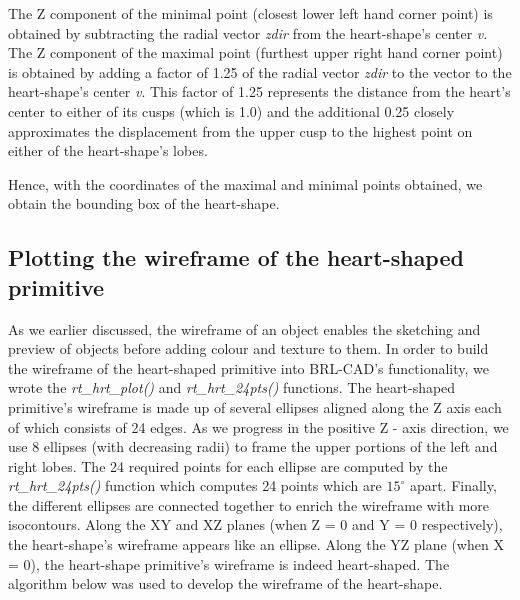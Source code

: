 \hspace{30} The   Z component   of   the   minimal   point   (closest   lower   left   hand   corner   point)   is  
obtained   by   subtracting   the   radial   vector \textit{zdir}  from   the   heart-­shape's   center \textit{v}. The   Z  
component   of   the   maximal   point   (furthest   upper   right   hand   corner   point)   is  
obtained   by   adding a factor   of   1.25 of the radial vector \textit{zdir}  to   the   vector   to   the   heart­-shape's  
center \textit{v}. This   factor   of   1.25 represents   the   distance   from   the   heart's  
center   to   either   of   its   cusps   (which   is   1.0)   and   the   additional   0.25   closely  
approximates   the   displacement   from   the   upper   cusp   to   the   highest   point   on  
either   of   the heart-shape's   lobes.

Hence, with   the   coordinates   of   the   maximal   and   minimal   points obtained, we obtain the bounding box of the heart-­shape.  

\subsection{Plotting the wireframe of the heart-­shaped primitive}

\hspace{30} As   we   earlier   discussed,   the   wireframe   of   an   object   enables   the  
sketching   and   preview   of   objects   before   adding   colour   and   texture   to   them.   In  
order   to   build   the   wireframe   of   the   heart-­shaped   primitive   into   BRL-­CAD's  
functionality,   we   wrote   the   \textit{rt\_hrt\_plot()}   and   \textit{rt\_hrt\_24pts()}   functions.   The  
heart-­shaped   primitive's   wireframe   is   made   up   of   several   ellipses   aligned   along  
the   Z   axis   each   of   which   consists   of   24   edges.   As   we   progress   in   the   positive  
 Z - ­axis   direction,   we   use   8   ellipses   (with   decreasing   radii)   to   frame   the   upper  
portions   of   the   left   and   right   lobes.   The   24   required   points   for   each   ellipse   are  
computed   by   the   \textit{rt\_hrt\_24pts()} function which computes 24 points which are $15^{\circ}$ apart.
Finally,   the   different   ellipses   are  connected   together   to   enrich   the   wireframe   
with   more   iso­contours.   Along   the  XY   and   XZ   planes   (when   Z   =   0   and   Y   =   0   respectively), the   heart-­shape's  wireframe   appears   like   an   ellipse.   Along   the   YZ   plane   (when   X   =   0),   the  
heart-­shape   primitive's   wireframe   is   indeed   heart­-shaped.   The   algorithm   below  
was used to develop the wireframe of the heart­-shape.  

